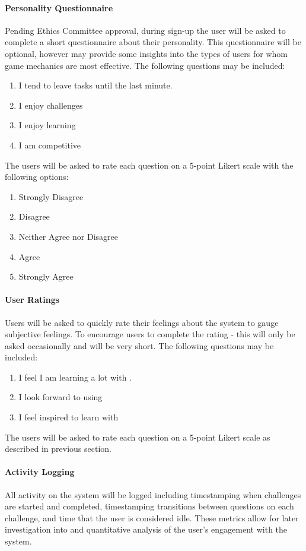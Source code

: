 \paragraph{Personality Questionnaire}
Pending Ethics Committee approval, during sign-up the user will be asked to complete a short questionnaire about their personality. This questionnaire will be optional, however may provide some insights into the types of users for whom game mechanics are most effective. The following questions may be included:

\begin{enumerate}
    \item I tend to leave tasks until the last minute.
    \item I enjoy challenges
    \item I enjoy learning
    \item I am competitive
\end{enumerate}

The users will be asked to rate each question on a 5-point Likert scale \cite{likert_technique_1932} with the following options:
\begin{enumerate}
	\item Strongly Disagree
	\item Disagree
	\item Neither Agree nor Disagree
	\item Agree
	\item Strongly Agree
\end{enumerate}

\paragraph{User Ratings}
Users will be asked to quickly rate their feelings about the system to gauge subjective feelings. To encourage users to complete the rating - this will only be asked occasionally and will be very short. The following questions may be included:

\begin{enumerate}
    \item I feel I am learning a lot with \SoftName.
    \item I look forward to using \SoftName\
    \item I feel inspired to learn with \SoftName\
\end{enumerate}

The users will be asked to rate each question on a 5-point Likert scale as described in previous section.

\paragraph{Activity Logging}
All activity on the system will be logged including timestamping when challenges are started and 
completed, timestamping transitions between questions on each challenge, and time that 
the user is considered idle. These metrics allow for later investigation into 
and quantitative analysis of the user's engagement with the system.
